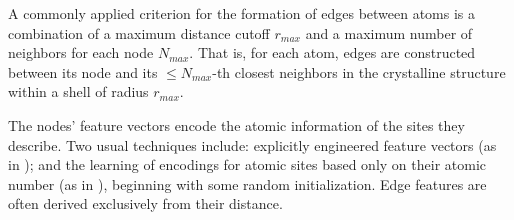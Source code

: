 \documentclass[twoside,twocolumn,9pt]{article}
\begin{document}

A commonly applied criterion for the formation of edges between atoms is a combination of a maximum distance cutoff $r_{max}$ and a maximum number of neighbors for each node $N_{max}$. That is, for each atom, edges are constructed between its node and its $\leq N_{max}$-th closest neighbors in the crystalline structure within a shell of radius $r_{max}$.




The nodes' feature vectors encode the atomic information of the sites they describe. Two usual techniques include: explicitly engineered feature vectors (as in \cite{cgcnn}); and the learning of encodings for atomic sites based only on their atomic number (as in \cite{megnet}), beginning with some random initialization. Edge features are often derived exclusively from their distance.


\end{document}
